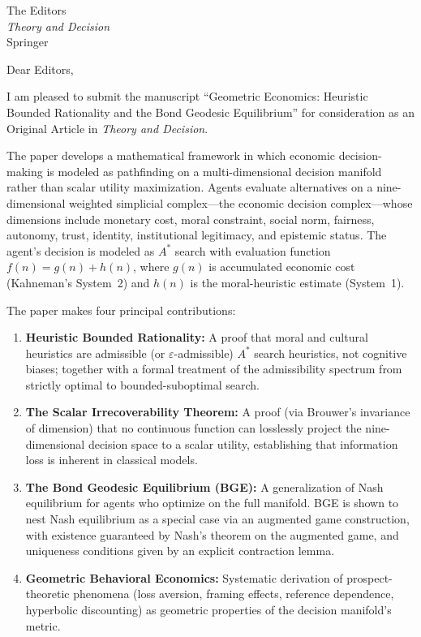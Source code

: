 \documentclass[12pt]{letter}
\begin{document}
\begin{letter}{%
The Editors\\
\emph{Theory and Decision}\\
Springer}

\opening{Dear Editors,}

I am pleased to submit the manuscript ``Geometric Economics: Heuristic Bounded Rationality and the Bond Geodesic Equilibrium'' for consideration as an Original Article in \emph{Theory and Decision}.

The paper develops a mathematical framework in which economic decision-making is modeled as pathfinding on a multi-dimensional decision manifold rather than scalar utility maximization.  Agents evaluate alternatives on a nine-dimensional weighted simplicial complex---the economic decision complex---whose dimensions include monetary cost, moral constraint, social norm, fairness, autonomy, trust, identity, institutional legitimacy, and epistemic status.  The agent's decision is modeled as $A^*$ search with evaluation function $f(n) = g(n) + h(n)$, where $g(n)$ is accumulated economic cost (Kahneman's System~2) and $h(n)$ is the moral-heuristic estimate (System~1).

The paper makes four principal contributions:
\begin{enumerate}
    \item \textbf{Heuristic Bounded Rationality:} A proof that moral and cultural heuristics are admissible (or $\varepsilon$-admissible) $A^*$ search heuristics, not cognitive biases; together with a formal treatment of the admissibility spectrum from strictly optimal to bounded-suboptimal search.
    \item \textbf{The Scalar Irrecoverability Theorem:} A proof (via Brouwer's invariance of dimension) that no continuous function can losslessly project the nine-dimensional decision space to a scalar utility, establishing that information loss is inherent in classical models.
    \item \textbf{The Bond Geodesic Equilibrium (BGE):} A generalization of Nash equilibrium for agents who optimize on the full manifold.  BGE is shown to nest Nash equilibrium as a special case via an augmented game construction, with existence guaranteed by Nash's theorem on the augmented game, and uniqueness conditions given by an explicit contraction lemma.
    \item \textbf{Geometric Behavioral Economics:} Systematic derivation of prospect-theoretic phenomena (loss aversion, framing effects, reference dependence, hyperbolic discounting) as geometric properties of the decision manifold's metric.
\end{enumerate}


\end{letter}
\end{document}
